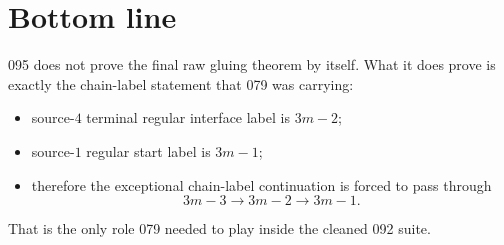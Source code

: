 \documentclass[11pt]{article}
\begin{document}
\section{Bottom line}

095 does not prove the final raw gluing theorem by itself. What it does prove
is exactly the chain-label statement that 079 was carrying:
\begin{itemize}[leftmargin=2em]
\item source-$4$ terminal regular interface label is $3m-2$;
\item source-$1$ regular start label is $3m-1$;
\item therefore the exceptional chain-label continuation is forced to pass
      through
      \[
      3m-3 \to 3m-2 \to 3m-1.
      \]
\end{itemize}
That is the only role 079 needed to play inside the cleaned 092 suite.
\end{document}
